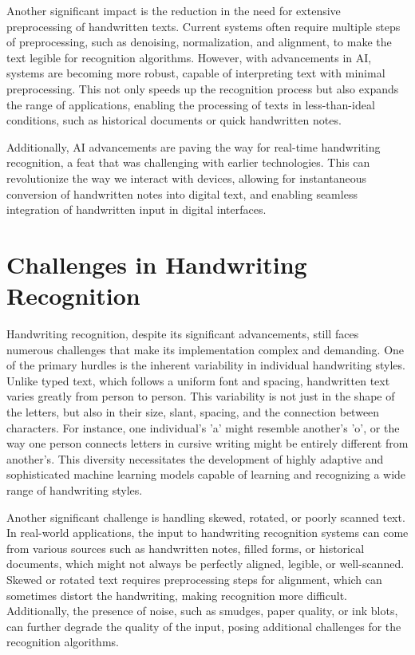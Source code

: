 \documentclass[12pt]{article}
\begin{document}
Another significant impact is the reduction in the need for extensive preprocessing of handwritten texts. Current systems often require multiple steps of preprocessing, such as denoising, normalization, and alignment, to make the text legible for recognition algorithms. However, with advancements in AI, systems are becoming more robust, capable of interpreting text with minimal preprocessing. This not only speeds up the recognition process but also expands the range of applications, enabling the processing of texts in less-than-ideal conditions, such as historical documents or quick handwritten notes.

Additionally, AI advancements are paving the way for real-time handwriting recognition, a feat that was challenging with earlier technologies. This can revolutionize the way we interact with devices, allowing for instantaneous conversion of handwritten notes into digital text, and enabling seamless integration of handwritten input in digital interfaces.

\section* {Challenges in Handwriting Recognition}
Handwriting recognition, despite its significant advancements, still faces numerous challenges that make its implementation complex and demanding. One of the primary hurdles is the inherent variability in individual handwriting styles. Unlike typed text, which follows a uniform font and spacing, handwritten text varies greatly from person to person. This variability is not just in the shape of the letters, but also in their size, slant, spacing, and the connection between characters. For instance, one individual's 'a' might resemble another's 'o', or the way one person connects letters in cursive writing might be entirely different from another's. This diversity necessitates the development of highly adaptive and sophisticated machine learning models capable of learning and recognizing a wide range of handwriting styles.

Another significant challenge is handling skewed, rotated, or poorly scanned text. In real-world applications, the input to handwriting recognition systems can come from various sources such as handwritten notes, filled forms, or historical documents, which might not always be perfectly aligned, legible, or well-scanned. Skewed or rotated text requires preprocessing steps for alignment, which can sometimes distort the handwriting, making recognition more difficult. Additionally, the presence of noise, such as smudges, paper quality, or ink blots, can further degrade the quality of the input, posing additional challenges for the recognition algorithms.

\newpage



\cite{Advances}
\cite{Improvements}
\cite{OF}
\end{document}
